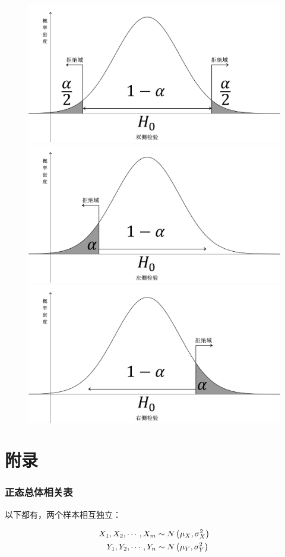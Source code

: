 \documentclass{article}
\begin{document}
\begin{figure}[H]
    \centering
    \includegraphics[width=0.6\linewidth]{BilateralTesting.png}
    \includegraphics[width=0.6\linewidth]{LeftSideTest.png}
    \includegraphics[width=0.6\linewidth]{RightSideTest.png}
\end{figure}

\newpage

\appendix

\part{附录}

\section{正态总体相关表}

以下都有，两个样本相互独立：

\[\begin{aligned}
        X_1,X_2,\cdots,X_m & \sim N\left(\mu_X,\sigma_X^2\right) \\
        Y_1,Y_2,\cdots,Y_n & \sim N\left(\mu_Y,\sigma_Y^2\right)
    \end{aligned}\]
\end{document}
